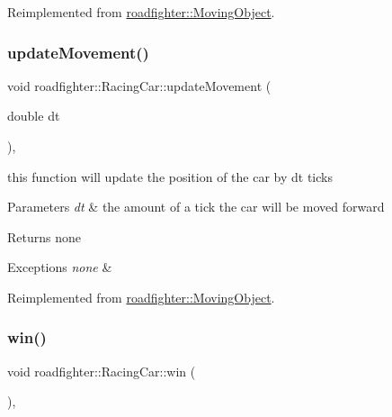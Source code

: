 Reimplemented from \hyperlink{classroadfighter_1_1MovingObject_a2c5d69054a59fc5c6d7458f864ee9d57}{roadfighter\+::\+Moving\+Object}.

\mbox{\label{classroadfighter_1_1RacingCar_a2e8f3c63381a1fe432cddcc1f34fb935}} 
\subsubsection{\texorpdfstring{update\+Movement()}{updateMovement()}}
{\footnotesize\ttfamily void roadfighter\+::\+Racing\+Car\+::update\+Movement (\begin{DoxyParamCaption}\item[{double}]{dt }\end{DoxyParamCaption})\hspace{0.3cm}{\ttfamily [override]}, {\ttfamily [virtual]}}

this function will update the position of the car by dt ticks 
\begin{DoxyParams}{Parameters}
{\em dt} & the amount of a tick the car will be moved forward \\
\hline
\end{DoxyParams}
\begin{DoxyReturn}{Returns}
none 
\end{DoxyReturn}

\begin{DoxyExceptions}{Exceptions}
{\em none} & \\
\hline
\end{DoxyExceptions}


Reimplemented from \hyperlink{classroadfighter_1_1MovingObject_ac1918d96dac118c4bd7d99168d92867c}{roadfighter\+::\+Moving\+Object}.

\mbox{\label{classroadfighter_1_1RacingCar_a24293ac56920da01d29fe99aee8d3ea6}} 
\subsubsection{\texorpdfstring{win()}{win()}}
{\footnotesize\ttfamily void roadfighter\+::\+Racing\+Car\+::win (\begin{DoxyParamCaption}{ }\end{DoxyParamCaption})\hspace{0.3cm}{\ttfamily [override]}, {\ttfamily [virtual]}}

